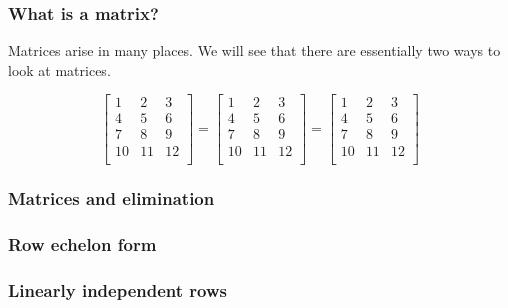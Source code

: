 

\begin{frame}
  \frametitle{What is a matrix?}

  Matrices arise in many places.  We will see that there are
  essentially two ways to look at matrices.
  
  \[
  \left[
    \begin{array}{c|c|c}
      1 & 2 & 3 \\
      4 & 5 & 6 \\
      7 & 8 & 9 \\
      10 & 11 & 12 \\
    \end{array}
    \right]
  =
  \left[
    \begin{array}{ccc}
      1 & 2 & 3 \\
      4 & 5 & 6 \\
      7 & 8 & 9 \\
      10 & 11 & 12 \\
    \end{array}
    \right]
  =
  \left[
    \begin{array}{ccc}
      1 & 2 & 3 \\
      \hline
      4 & 5 & 6 \\
      \hline
      7 & 8 & 9 \\
      \hline
      10 & 11 & 12 \\
    \end{array}
    \right]
  \]
\end{frame}

\begin{frame}
  \frametitle{Matrices and elimination}
\end{frame}

\begin{frame}
  \frametitle{Row echelon form}
\end{frame}

\begin{frame}
  \frametitle{Linearly independent rows}
  
\end{frame}

